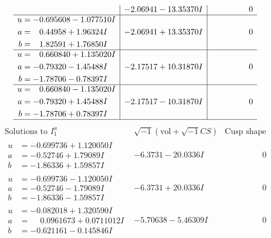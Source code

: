 \documentclass[1p]{elsarticle_modified}
\theoremstyle{definition}
\newcommand{\I}{\sqrt{-1}}
\begin{document}
$$\begin{array}{c|c|c}
 & -2.06941 - 13.35370 I & \phantom{-0.000000 } 0 \\ \hline\begin{aligned}
u &= -0.695608 - 1.077510 I \\
a &= \phantom{-}0.44958 + 1.96324 I \\
b &= \phantom{-}1.82591 + 1.76850 I\end{aligned}
 & -2.06941 + 13.35370 I & \phantom{-0.000000 } 0 \\ \hline\begin{aligned}
u &= \phantom{-}0.660840 + 1.135020 I \\
a &= -0.79320 - 1.45488 I \\
b &= -1.78706 - 0.78397 I\end{aligned}
 & -2.17517 + 10.31870 I & \phantom{-0.000000 } 0 \\ \hline\begin{aligned}
u &= \phantom{-}0.660840 - 1.135020 I \\
a &= -0.79320 + 1.45488 I \\
b &= -1.78706 + 0.78397 I\end{aligned}
 & -2.17517 - 10.31870 I & \phantom{-0.000000 } 0\\
 \hline 
 \end{array}$$\newpage$$\begin{array}{c|c|c}  
\text{Solutions to }I^u_{1}& \I (\text{vol} + \sqrt{-1}CS) & \text{Cusp shape}\\
 \hline 
\begin{aligned}
u &= -0.699736 + 1.120050 I \\
a &= -0.52746 + 1.79089 I \\
b &= -1.86336 + 1.59857 I\end{aligned}
 & -6.3731 - 20.0336 I & \phantom{-0.000000 } 0 \\ \hline\begin{aligned}
u &= -0.699736 - 1.120050 I \\
a &= -0.52746 - 1.79089 I \\
b &= -1.86336 - 1.59857 I\end{aligned}
 & -6.3731 + 20.0336 I & \phantom{-0.000000 } 0 \\ \hline\begin{aligned}
u &= -0.082018 + 1.320590 I \\
a &= \phantom{-}0.0961673 + 0.0711012 I \\
b &= -0.621161 - 0.145846 I\end{aligned}
 & -5.70638 - 5.46309 I & \phantom{-0.000000 } 0 \\ \hline\begin{aligned}

\end{aligned}
\end{array}$$
\end{document}
